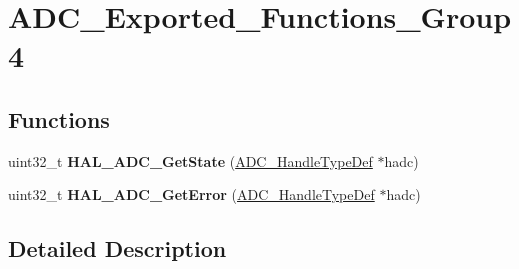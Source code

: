 \hypertarget{group___a_d_c___exported___functions___group4}{}\section{A\+D\+C\+\_\+\+Exported\+\_\+\+Functions\+\_\+\+Group4}
\label{group___a_d_c___exported___functions___group4}
\subsection*{Functions}
\begin{DoxyCompactItemize}
\item 
\mbox{\label{group___a_d_c___exported___functions___group4_ga894143f0fa1502ac0afa6eae8fdaadcc}} 
uint32\+\_\+t {\bfseries H\+A\+L\+\_\+\+A\+D\+C\+\_\+\+Get\+State} (\mbox{\hyperlink{struct_a_d_c___handle_type_def}{A\+D\+C\+\_\+\+Handle\+Type\+Def}} $\ast$hadc)
\item 
\mbox{\label{group___a_d_c___exported___functions___group4_ga3a546afb96f473f266573783f37ee8af}} 
uint32\+\_\+t {\bfseries H\+A\+L\+\_\+\+A\+D\+C\+\_\+\+Get\+Error} (\mbox{\hyperlink{struct_a_d_c___handle_type_def}{A\+D\+C\+\_\+\+Handle\+Type\+Def}} $\ast$hadc)
\end{DoxyCompactItemize}


\subsection{Detailed Description}
